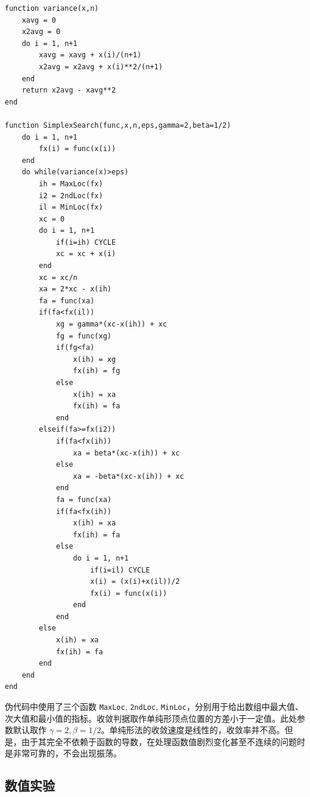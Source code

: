 \begin{algorithmBox}
\begin{lstlisting}[style=bellacode]
function variance(x,n)
    xavg = 0
    x2avg = 0
    do i = 1, n+1
        xavg = xavg + x(i)/(n+1)
        x2avg = x2avg + x(i)**2/(n+1)
    end
    return x2avg - xavg**2
end

function SimplexSearch(func,x,n,eps,gamma=2,beta=1/2)
    do i = 1, n+1
        fx(i) = func(x(i))
    end
    do while(variance(x)>eps)
        ih = MaxLoc(fx)
        i2 = 2ndLoc(fx)
        il = MinLoc(fx)
        xc = 0
        do i = 1, n+1
            if(i=ih) CYCLE
            xc = xc + x(i)
        end
        xc = xc/n
        xa = 2*xc - x(ih)
        fa = func(xa)
        if(fa<fx(il))
            xg = gamma*(xc-x(ih)) + xc
            fg = func(xg)
            if(fg<fa)
                x(ih) = xg
                fx(ih) = fg
            else
                x(ih) = xa
                fx(ih) = fa
            end
        elseif(fa>=fx(i2))
            if(fa<fx(ih))
                xa = beta*(xc-x(ih)) + xc
            else
                xa = -beta*(xc-x(ih)) + xc
            end
            fa = func(xa)
            if(fa<fx(ih))
                x(ih) = xa
                fx(ih) = fa
            else
                do i = 1, n+1
                    if(i=il) CYCLE
                    x(i) = (x(i)+x(il))/2
                    fx(i) = func(x(i))
                end
            end
        else
            x(ih) = xa
            fx(ih) = fa
        end
    end
end
\end{lstlisting}
\end{algorithmBox}

伪代码中使用了三个函数 \texttt{MaxLoc}, \texttt{2ndLoc}, \texttt{MinLoc}，分别用于给出数组中最大值、次大值和最小值的指标。收敛判据取作单纯形顶点位置的方差小于一定值。此处参数默认取作 $\gamma=2,\beta=1/2$。单纯形法的收敛速度是线性的，收敛率并不高。但是，由于其完全不依赖于函数的导数，在处理函数值剧烈变化甚至不连续的问题时是非常可靠的，不会出现振荡。

\subsection{数值实验}

